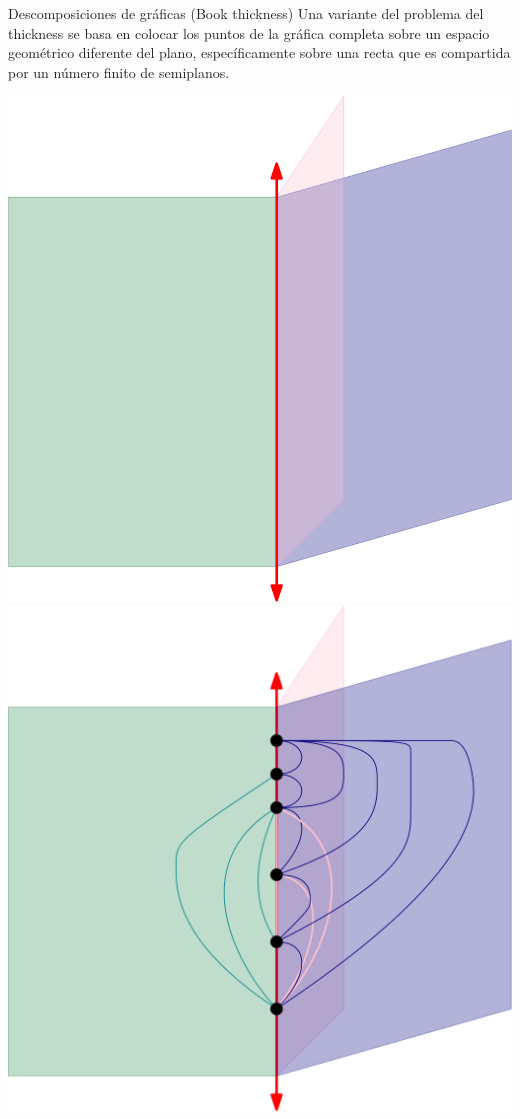 \begin{frame}{Descomposiciones de gráficas (Book thickness)}
	Una variante del problema del thickness se basa en colocar los puntos de la gráfica completa sobre un espacio geométrico diferente del plano, específicamente sobre una recta que es compartida por un número finito de semiplanos. 
	\pause
	\begin{center}
	\includegraphics[width=0.4\linewidth]{images/book}
	\pause
	\quad
	\includegraphics[width=0.4\linewidth]{images/book-thickness}
	\end{center}
\end{frame}




